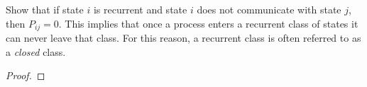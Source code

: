 \begin{problem}{4.16}
  Show that if state $i$ is recurrent and state $i$ does not communicate with state
  $j$, then $P_{ij} = 0$. This implies that once a process enters a recurrent class
  of states it can never leave that class. For this reason, a recurrent class
  is often referred to as a \emph{closed} class.
\end{problem}

\begin{proof}
\end{proof}
\newpage
